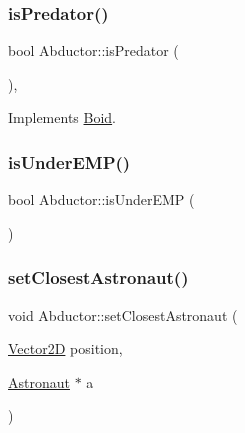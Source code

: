 \subsubsection{\texorpdfstring{is\+Predator()}{isPredator()}}
{\footnotesize\ttfamily bool Abductor\+::is\+Predator (\begin{DoxyParamCaption}{ }\end{DoxyParamCaption})\hspace{0.3cm}{\ttfamily [override]}, {\ttfamily [virtual]}}



Implements \hyperlink{class_boid_afdc731ff7d6b7f471c202c191c4abf77}{Boid}.

\hypertarget{class_abductor_ab54e8bd43da87e3328ccaab48cbc79bb}{}\label{class_abductor_ab54e8bd43da87e3328ccaab48cbc79bb} 
\subsubsection{\texorpdfstring{is\+Under\+E\+M\+P()}{isUnderEMP()}}
{\footnotesize\ttfamily bool Abductor\+::is\+Under\+E\+MP (\begin{DoxyParamCaption}{ }\end{DoxyParamCaption})}

\hypertarget{class_abductor_a3d6281a8a4ab08f7a01e358aa6c0ca7f}{}\label{class_abductor_a3d6281a8a4ab08f7a01e358aa6c0ca7f} 
\subsubsection{\texorpdfstring{set\+Closest\+Astronaut()}{setClosestAstronaut()}}
{\footnotesize\ttfamily void Abductor\+::set\+Closest\+Astronaut (\begin{DoxyParamCaption}\item[{\hyperlink{class_vector2_d}{Vector2D}}]{position,  }\item[{\hyperlink{class_astronaut}{Astronaut} $\ast$}]{a }\end{DoxyParamCaption})}

\hypertarget{class_abductor_a8be0f01a614756f913acf032fa64f474}{}\label{class_abductor_a8be0f01a614756f913acf032fa64f474} 
